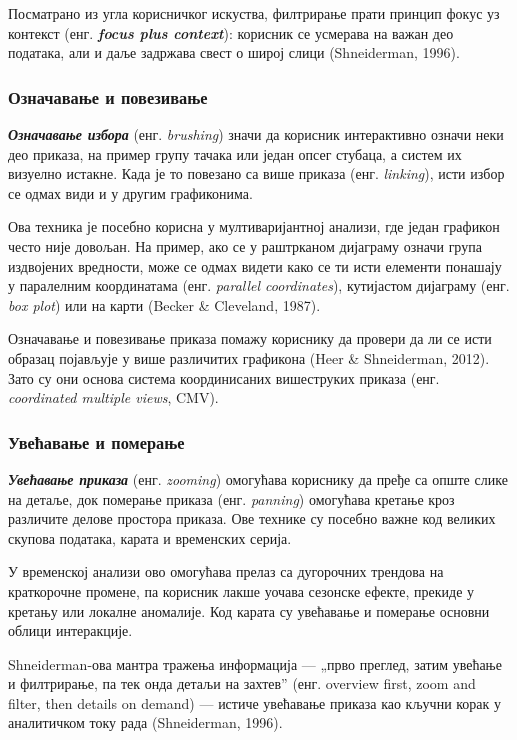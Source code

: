 Посматрано из угла корисничког искуства, филтрирање прати принцип фокус уз контекст (енг. \textbf{\textit{focus plus context}}): корисник се усмерава на важан део података, али и даље задржава свест о широј слици (Shneiderman, 1996).

\subsubsection{Означавање и повезивање}
\textbf{\textit{Означавање избора}} (енг. \textit{brushing}) значи да корисник интерактивно означи неки део приказа, на пример групу тачака или један опсег стубаца, а систем их визуелно истакне. Када је то повезано са више приказа (енг. \textit{linking}), исти избор се одмах види и у другим графиконима.

Ова техника је посебно корисна у мултиваријантној анализи, где један графикон често није довољан. На пример, ако се у раштрканом дијаграму означи група издвојених вредности, може се одмах видети како се ти исти елементи понашају у паралелним координатама (енг. \textit{parallel coordinates}), кутијастом дијаграму (енг. \textit{box plot}) или на карти (Becker \& Cleveland, 1987).

Означавање и повезивање приказа помажу кориснику да провери да ли се исти образац појављује у више различитих графикона (Heer \& Shneiderman, 2012). Зато су они основа система координисаних вишеструких приказа (енг. \textit{coordinated multiple views}, CMV).

\subsubsection{Увећавање и померање}
\textbf{\textit{Увећавање приказа}} (енг. \textit{zooming}) омогућава кориснику да пређе са опште слике на детаље, док померање приказа (енг. \textit{panning}) омогућава кретање кроз различите делове простора приказа. Ове технике су посебно важне код великих скупова података, карата и временских серија.

У временској анализи ово омогућава прелаз са дугорочних трендова на краткорочне промене, па корисник лакше уочава сезонске ефекте, прекиде у кретању или локалне аномалије. Код карата су увећавање и померање основни облици интеракције.

Shneiderman-ова мантра тражења информација — „прво преглед, затим увећање и филтрирање, па тек онда детаљи на захтев” (енг. overview first, zoom and filter, then details on demand) — истиче увећавање приказа као кључни корак у аналитичком току рада (Shneiderman, 1996).

